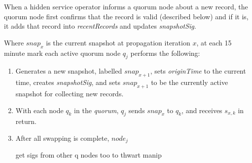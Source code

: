 When a hidden service operator informs a quorum node about a new record, the quorum node first confirms that the record is valid (described below) and if it is, it adds that record into \emph{recentRecords} and updates \emph{snapshotSig}. 


Where $ snap_{x} $ is the current snapshot at propagation iteration $ x $, at each 15 minute mark each active quorum node $ q_{j} $ performs the following:

\begin{enumerate}
	\item Generates a new snapshot, labelled $ snap_{x+1} $, sets \emph{originTime} to the current time, creates \emph{snapshotSig}, and sets $ snap_{x+1} $ to be the currently active snapshot for collecting new records.
	\item With each node $ q_{k} $ in the \emph{quorum}, $ q_{j} $ sends $ snap_{x} $ to $ q_{k} $, and receives $ s_{x, k} $ in return.
	\item After all swapping is complete, $ node_{j} $
	
get sigs from other q nodes too to thwart manip	
	
%
%
%
%	
\end{enumerate}


